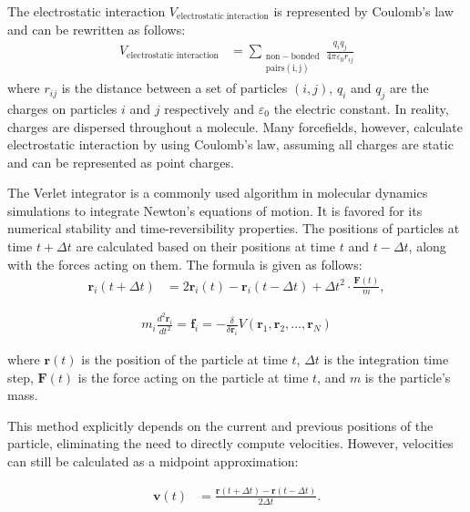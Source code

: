 \documentclass[conference]{IEEEtran}
\begin{document}
The electrostatic interaction $V_{\mathrm{electrostatic \; interaction}}$ is represented by Coulomb's law and can 
be rewritten as follows: 
\begin{equation}
    \begin{aligned}
    V_{\mathrm{electrostatic \; interaction}} &= \sum_{\mathrm{\substack{\mathrm{non-bonded} \\ \mathrm{pairs(i,j)}}}} \frac{q_i q_j}{4\pi\varepsilon_0r_{ij}}
    \end{aligned}
\end{equation}
where $r_{ij}$ is the distance between a set of particles $(i,j)$, $q_i$ and $q_j$ are the charges on particles $i$ 
and $j$ respectively and $\varepsilon_0$ the electric constant. In reality, charges are dispersed throughout a 
molecule. Many forcefields, however, calculate electrostatic interaction by using Coulomb's law, assuming all charges 
are static and can be represented as point charges. 

The Verlet integrator is a commonly used algorithm in molecular dynamics simulations to integrate Newton's equations 
of motion. It is favored for its numerical stability and time-reversibility properties. The positions of particles 
at time \( t + \Delta t \) are calculated based on their positions at time \( t \) and \( t - \Delta t \), along 
with the forces acting on them. The formula is given as follows:
\begin{align}
    \mathbf{r}_i(t + \Delta t) &= 2\mathbf{r}_i(t) - \mathbf{r}_i(t - \Delta t) + \Delta t^2 \cdot \frac{\mathbf{F}(t)}{m},
\end{align}

\begin{align}
    m_i \frac{d^2\mathbf{r}_i}{dt^2} = \mathbf{f}_i = -\frac{\delta}{\delta \mathbf{r}_i}V(\mathbf{r}_1,\mathbf{r}_2,\ldots,\mathbf{r}_N)
\end{align}

where \( \mathbf{r}(t) \) is the position of the particle at time \( t \), \( \Delta t \) is the integration time 
step, \( \mathbf{F}(t) \) is the force acting on the particle at time \( t \), and \( m \) is the particle's mass.

This method explicitly depends on the current and previous positions of the particle, eliminating the need to directly 
compute velocities. However, velocities can still be calculated as a midpoint approximation:

\begin{equation}
    \begin{aligned}
    \mathbf{v}(t) &= \frac{\mathbf{r}(t + \Delta t) - \mathbf{r}(t - \Delta t)}{2\Delta t}.
    \end{aligned}
\end{equation}
\end{document}
